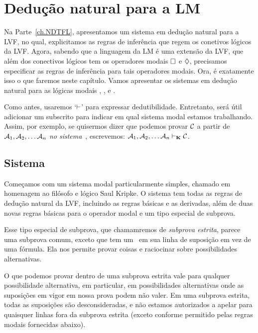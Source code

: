 \chapter{Dedução natural para a LM}
\label{Proof}

Na Parte~\ref{ch.NDTFL},  apresentamos um sistema em dedução natural para a LVF, no qual, explicitamos as regras de inferência que regem os conetivos lógicos da  LVF.  Agora, sabendo que a linguagem da LM é uma extensão da LVF,  que além dos conectivos lógicos tem os operadores modais   $\Box$ e $\Diamond$,  precisamos especificar as regras de inferência para tais operadores modais. Ora, é exatamente isso o que faremos neste capítulo. Vamos apresentar os sistemas em dedução  natural  para as lógicas modais  \mlK, \mlT, \mlSfour{} e \mlSfive.

Como  antes,  usaremos `$\vdash$' para expressar dedutibilidade. Entretanto, será útil adicionar um subscrito para indicar em qual sistema modal estamos trabalhando. Assim,  por exemplo, se quisermos dizer que podemos provar $\mathcal{C}$ a partir de $\mathcal{A}_1,\mathcal{A}_2, \dots \mathcal{A}_n$ \emph{no sistema}~\mlK, escrevemos: $\mathcal{A}_1,\mathcal{A}_2, \dots \mathcal{A}_n \vdash_{\mathbf{K}} \mathcal{C}$.

\section{Sistema \mlK}
\label{K}

Começamos com um sistema modal particularmente simples, chamado \mlK{} em homenagem ao filósofo e lógico Saul Kripke. O sistema \mlK{} tem todas as regras de dedução natural da  LVF, incluindo as regras  básicas e as derivadas, além de  duas novas regras básicas para o operador modal   \ebox{}  e um tipo especial de subprova.   

Esse  tipo especial de subprova, que chamamremos de  \emph{subprova estrita}, parece uma subprova comum, exceto que tem um~\ebox{} em sua linha de suposição em vez de uma fórmula. Ela nos permite provar coisas e raciocinar sobre possibilidades alternativas. 
 
 O que podemos provar dentro de uma subprova estrita vale para qualquer possibilidade alternativa, em particular, em possibilidades alternativas onde as suposições em vigor em nossa prova podem não valer. Em uma subprova estrita, todas as suposições são desconsideradas, e não estamos autorizados a apelar para quaisquer linhas fora da subprova estrita (exceto conforme permitido pelas regras modais fornecidas abaixo).

